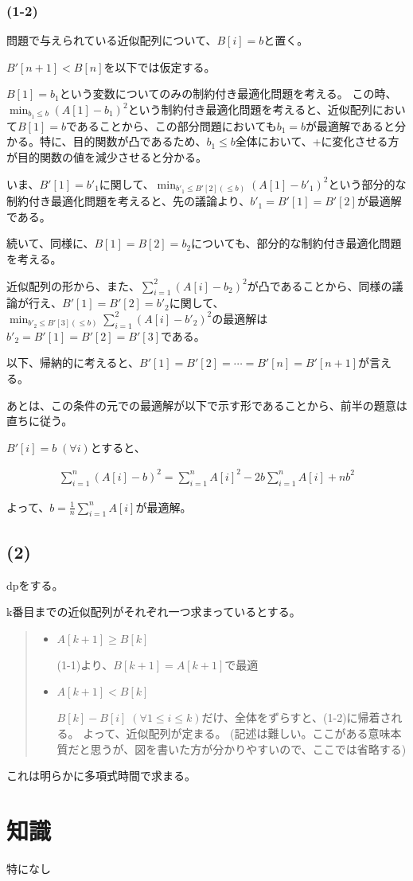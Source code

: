 \documentclass[a4paper, 10pt, dvipdfmx]{jlreq}
\begin{document}
\subsubsection*{(1-2)}

問題で与えられている近似配列について、$B[i]=b$と置く。

$B'[n+1]<B[n]$を以下では仮定する。

$B[1]=b_1$という変数についてのみの制約付き最適化問題を考える。
この時、$\min_{b_1\leq b}(A[1]-b_1)^2$という制約付き最適化問題を考えると、近似配列において$B[1]=b$であることから、この部分問題においても$b_1=b$が最適解であると分かる。特に、目的関数が凸であるため、$b_1 \leq b$全体において、+に変化させる方が目的関数の値を減少させると分かる。

いま、$B'[1]=b'_1$に関して、$\min_{b'_1 \leq B'[2] (\leq b)}(A[1]-b'_1)^2$という部分的な制約付き最適化問題を考えると、先の議論より、$b'_1=B'[1]=B'[2]$が最適解である。

続いて、同様に、$B[1]=B[2]=b_2$についても、部分的な制約付き最適化問題を考える。

近似配列の形から、また、$\sum_{i=1}^{2}(A[i]-b_2)^2$が凸であることから、同様の議論が行え、$B'[1]=B'[2]=b'_2$に関して、$\min_{b'_2\leq B'[3](\leq b)}\sum_{i=1}^{2}(A[i]-b'_2)^2$の最適解は$b'_2=B'[1]=B'[2]=B'[3]$である。

以下、帰納的に考えると、$B'[1]=B'[2]=\cdots=B'[n]=B'[n+1]$が言える。

あとは、この条件の元での最適解が以下で示す形であることから、前半の題意は直ちに従う。

$B'[i]=b \; (\forall i)$とすると、

\begin{align*}
    \sum_{i=1}^{n}{(A[i]-b)^2} = \sum_{i=1}^{n}{A[i]^2} -2b \sum_{i=1}^{n}{A[i]} + nb^2
\end{align*}

よって、$b=\frac{1}{n}\sum_{i=1}^{n}{A[i]}$が最適解。

\subsection*{(2)}

dpをする。

k番目までの近似配列がそれぞれ一つ求まっているとする。

\begin{quote}
    \begin{itemize}
        \item  $A[k+1] \geq B[k]$

              (1-1)より、$B[k+1]=A[k+1]$で最適

        \item  $A[k+1] < B[k]$

              $B[k]-B[i] \; (\forall 1 \leq i \leq k)$だけ、全体をずらすと、(1-2)に帰着される。
              よって、近似配列が定まる。
              (記述は難しい。ここがある意味本質だと思うが、図を書いた方が分かりやすいので、ここでは省略する)
    \end{itemize}
\end{quote}

これは明らかに多項式時間で求まる。

\section{知識}

特になし
\end{document}
